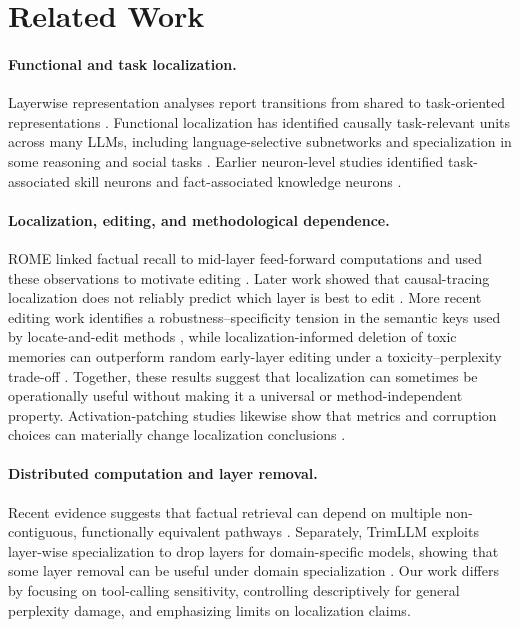 \documentclass[10pt,twocolumn]{article}
\begin{document}
\section{Related Work}
\paragraph{Functional and task localization.}
Layerwise representation analyses report transitions from shared to task-oriented representations \cite{zhao2024layer}. Functional localization has identified causally task-relevant units across many LLMs, including language-selective subnetworks and specialization in some reasoning and social tasks \cite{alkhamissi2025llm}. Earlier neuron-level studies identified task-associated skill neurons \cite{wang2022skill} and fact-associated knowledge neurons \cite{dai2022knowledge}.

\paragraph{Localization, editing, and methodological dependence.}
ROME linked factual recall to mid-layer feed-forward computations and used these observations to motivate editing \cite{meng2022rome}. Later work showed that causal-tracing localization does not reliably predict which layer is best to edit \cite{hase2023localization}. More recent editing work identifies a robustness--specificity tension in the semantic keys used by locate-and-edit methods \cite{yan2025robust}, while localization-informed deletion of toxic memories can outperform random early-layer editing under a toxicity--perplexity trade-off \cite{das2025toxic}. Together, these results suggest that localization can sometimes be operationally useful without making it a universal or method-independent property. Activation-patching studies likewise show that metrics and corruption choices can materially change localization conclusions \cite{zhang2024patching}.

\paragraph{Distributed computation and layer removal.}
Recent evidence suggests that factual retrieval can depend on multiple non-contiguous, functionally equivalent pathways \cite{hochman2026factual}. Separately, TrimLLM exploits layer-wise specialization to drop layers for domain-specific models, showing that some layer removal can be useful under domain specialization \cite{hu2025trimllm}. Our work differs by focusing on tool-calling sensitivity, controlling descriptively for general perplexity damage, and emphasizing limits on localization claims.
\end{document}
